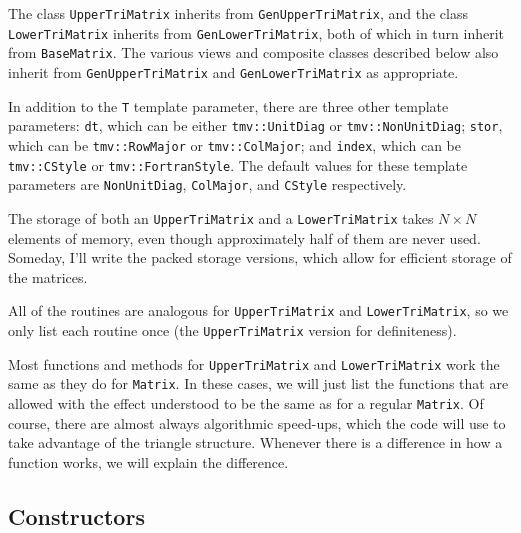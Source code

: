 \documentclass[twoside,letterpaper,11pt]{article}
\renewcommand{\tt}[1]{{\lstinline {#1}}}
\begin{document}
The class \tt{UpperTriMatrix} inherits from \tt{GenUpperTriMatrix}, 
and the class \tt{LowerTriMatrix}
inherits from \tt{GenLowerTriMatrix}, both of
which in turn inherit from \tt{BaseMatrix}.  
The various views and composite classes described below
also inherit from \tt{GenUpperTriMatrix} and \tt{GenLowerTriMatrix} 
as appropriate.

In addition to the \tt{T} template parameter, there are three other template 
parameters:
\tt{dt}, which can be either \tt{tmv::UnitDiag} or \tt{tmv::NonUnitDiag};
\tt{stor}, which can be \tt{tmv::RowMajor} or \tt{tmv::ColMajor};
and \tt{index}, which can be \tt{tmv::CStyle} or \tt{tmv::FortranStyle}.
The default values for these template parameters are 
\tt{NonUnitDiag}, \tt{ColMajor}, and \tt{CStyle} respectively.

The storage of both an \tt{UpperTriMatrix} and a \tt{LowerTriMatrix} takes
$N \times N$ elements of memory, even though approximately half of them 
are never used.  Someday, I'll write the packed storage versions, which allow for
efficient storage of the matrices.

All of the routines are analogous for \tt{UpperTriMatrix} and 
\tt{LowerTriMatrix}, so we only list each routine once 
(the \tt{UpperTriMatrix} version for
definiteness).  

Most functions and methods for \tt{UpperTriMatrix} and \tt{LowerTriMatrix}
work the same as they do for \tt{Matrix}.
In these cases, we will just list the functions that are allowed with the
effect understood to be the same as for a regular \tt{Matrix}.  Of course, there are 
almost always algorithmic speed-ups, which the code will use to take advantage of the 
triangle structure.
Whenever there is a difference in how a function works,
we will explain the difference.

\subsection{Constructors}
\label{TriMatrix_Constructors}
\end{document}
